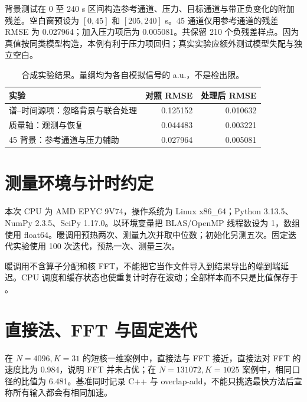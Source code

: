 背景测试在 0 至 240 s 区间构造参考通道、压力、目标通道与带正负变化的附加残差。空白窗预设为 $[0,45]$ 和 $[205,240]$ s。45 通道仅用参考通道的残差 RMSE 为 0.027964；加入压力项后为 0.005081。共保留 210 个负残差样点。因为真值按同类模型构造，本例有利于压力项回归；真实实验应额外测试模型失配与独立空白。

\begin{table}[htbp]\centering
\caption{合成实验结果。量纲均为各自模拟信号的 a.u.，不是检出限。}
\begin{tabular}{p{.43\linewidth}rr}\toprule
实验 & 对照 RMSE & 处理后 RMSE\\\midrule
谱--时间源项：忽略背景与联合处理 & 0.125152 & 0.010632\\
质量轴：观测与恢复 & 0.044483 & 0.003221\\
45 背景：参考通道与压力辅助 & 0.027964 & 0.005081\\\bottomrule
\end{tabular}
\end{table}

\section{测量环境与计时约定}
本次 CPU 为 AMD EPYC 9V74，操作系统为 Linux x86\_64；Python 3.13.5、NumPy 2.3.5、SciPy 1.17.0。以环境变量把 BLAS/OpenMP 线程数设为 1，数组使用 float64。暖调用预热两次、测量九次并取中位数；初始化另测五次。固定迭代实验使用 100 次迭代，预热一次、测量三次。

暖调用不含算子分配和核 FFT，不能把它当作文件导入到结果导出的端到端延迟。CPU 调度和缓存状态也使重复计时存在波动；全部样本而不只是比值保存于 。

\begin{table}[htbp]\centering\small
\caption{相同离散模型下的暖调用中位数。维度按 $(M,J,N,K)$，投影行最后一维为基数 $p$。}

\end{table}


\section{直接法、FFT 与固定迭代}
在 $N=4096,K=31$ 的短核一维案例中，直接法与 FFT 接近，直接法对 FFT 的速度比为 0.984，说明 FFT 并未占优；在 $N=131072,K=1025$ 案例中，相同口径的比值为 6.481。基准同时记录 C++ 与 overlap-add，不能只挑选最快方法后宣称所有输入都会有相同加速。

